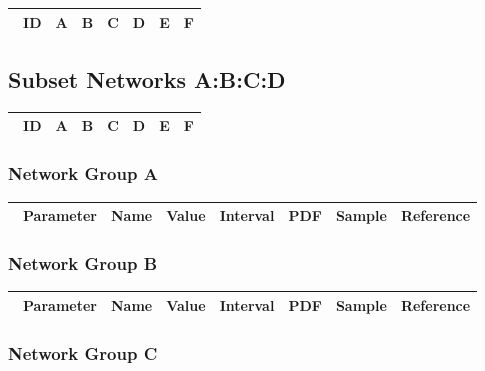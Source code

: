 \documentclass[preprint, 8pt]{elsarticle}
\theoremstyle{definition}
\begin{document}
\begin{table}[H]\centering
\begin{tabular}{p{1cm}p{1cm}p{1cm}p{1cm}p{1cm}p{1cm}p{4cm}}\
ID & A & B & C & D & E & F \\
\hline
\hline
\end{tabular}
\end{table}

\subsection{Subset Networks A:B:C:D}

\begin{table}[H]\centering
\begin{tabular}{p{1cm}p{1cm}p{1cm}p{1cm}p{1cm}p{1cm}p{4cm}}\
ID & A & B & C & D & E & F \\
\hline
\hline
\end{tabular}
\end{table}

\subsubsection{Network Group A}

\begin{table}[H]\centering
\begin{tabular}{p{1cm}p{1cm}p{1cm}p{1cm}p{1cm}p{1cm}p{4cm}}\
Parameter & Name & Value & Interval & PDF & Sample & Reference \\
\hline
\hline
\end{tabular}
\end{table}

\subsubsection{Network Group B}

\begin{table}[H]\centering
\begin{tabular}{p{1cm}p{1cm}p{1cm}p{1cm}p{1cm}p{1cm}p{4cm}}\
Parameter & Name & Value & Interval & PDF & Sample & Reference \\
\hline
\hline
\end{tabular}
\end{table}

\subsubsection{Network Group C}
\end{document}
